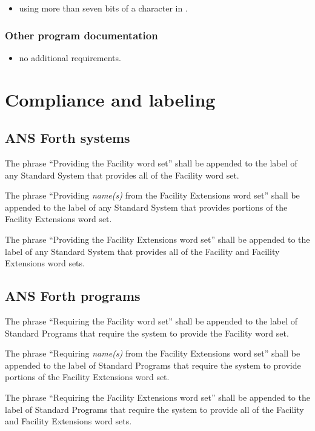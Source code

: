 \begin{itemize}
\item using more than seven bits of a character in
	.
\end{itemize}

\subsubsection{Other program documentation} %

\begin{itemize}
\item no additional requirements.
\end{itemize}

\section{Compliance and labeling} %

\subsection{ANS Forth systems} %

The phrase ``Providing the Facility word set'' shall be appended to
the label of any Standard System that provides all of the Facility
word set.

The phrase ``Providing \emph{name(s)} from the Facility Extensions
word set'' shall be appended to the label of any Standard System
that provides portions of the Facility Extensions word set.

The phrase ``Providing the Facility Extensions word set'' shall be
appended to the label of any Standard System that provides all of
the Facility and Facility Extensions word sets.

\subsection{ANS Forth programs} %

The phrase ``Requiring the Facility word set'' shall be appended to
the label of Standard Programs that require the system to provide
the Facility word set.

The phrase ``Requiring \emph{name(s)} from the Facility Extensions
word set'' shall be appended to the label of Standard Programs that
require the system to provide portions of the Facility Extensions
word set.

The phrase ``Requiring the Facility Extensions word set'' shall be
appended to the label of Standard Programs that require the system
to provide all of the Facility and Facility Extensions word sets.

